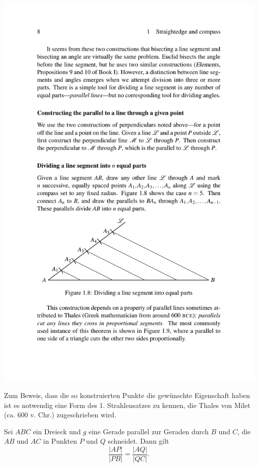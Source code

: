 \begin{center}
    \includegraphics[width=14cm]{BILDER/BildKonstruktionNTeilungStrecke.pdf}
\end{center}

Zum Beweis, dass die so konstruierten Punkte die gewünschte Eigenschaft haben ist es notwendig eine
Form des 1. Strahlensatzes zu kennen, die Thales von Milet (ca. 600 v. Chr.) zugeschrieben wird.

\begin{thm}[Strahlensatz]\label{thm:strahlensatz}
    Sei $ABC$ ein Dreieck und $g$ eine Gerade parallel zur Geraden durch $B$ und $C$, die $AB$ und
    $AC$ in Punkten $P$ und $Q$ schneidet. Dann gilt
    $$
        \frac{|AP|}{|PB|} = \frac{|AQ|}{|QC|}.
    $$
\end{thm}

